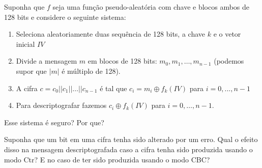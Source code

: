 \begin{exercicio}
  Suponha que $f$ seja uma função pseudo-aleatória com chave e blocos ambos de 128 bits e considere o seguinte sistema:
  \begin{enumerate}
  \item Seleciona aleatoriamente duas sequência de 128 bits, a chave $k$ e o vetor inicial $IV$
  \item Divide a mensagem $m$ em blocos de 128 bits: $m_0, m_1, \dots, m_{n-1}$ (podemos supor que $|m|$ é múltiplo de 128).
  \item A cifra $c = c_0 || c_1 || \dots || c_{n-1}$ é tal que $c_i = m_i \oplus f_k(IV)$ para $i = 0, ..., n-1$
  \item Para descriptografar fazemos $c_i \oplus f_k(IV)$ para $i = 0, \dots, n-1$.
  \end{enumerate}
  Esse sistema é seguro? Por que?
\end{exercicio}

\begin{exercicio}
Suponha que um bit em uma cifra tenha sido alterado por um erro.
Qual o efeito disso na mensagem descriptografada caso a cifra tenha sido produzida usando o modo Ctr? E no caso de ter sido produzida usando o modo CBC?  
\end{exercicio}



